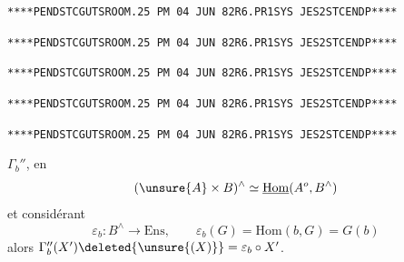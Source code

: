 \texttt{****P\quad END\quad STC\quad GUTS\qquad ROOM.25 PM 04 JUN 82\quad R6.PR1\quad SYS JES2\quad STC\quad END\quad P****}

\texttt{****P\quad END\quad STC\quad GUTS\qquad ROOM.25 PM 04 JUN 82\quad R6.PR1\quad SYS JES2\quad STC\quad END\quad P****}

\texttt{****P\quad END\quad STC\quad GUTS\qquad ROOM.25 PM 04 JUN 82\quad R6.PR1\quad SYS JES2\quad STC\quad END\quad P****}

\texttt{****P\quad END\quad STC\quad GUTS\qquad ROOM.25 PM 04 JUN 82\quad R6.PR1\quad SYS JES2\quad STC\quad END\quad P****}

\texttt{****P\quad END\quad STC\quad GUTS\qquad ROOM.25 PM 04 JUN 82\quad R6.PR1\quad SYS JES2\quad STC\quad END\quad P****}

 \(\Gamma_b''\), en
\[(\unsure{A}\times B)^\wedge\simeq\underline{\mathrm{Hom}}(A^o,B^\wedge)\]
et considérant 
\[\varepsilon_b:B^\wedge\longrightarrow\mathrm{Ens},\qquad\varepsilon_b(G)=\mathrm{Hom}(b,G)=G(b)\]
alors \(\Gamma_b''(X')\deleted{\unsure{(X)}}=\varepsilon_b\circ X'\).

